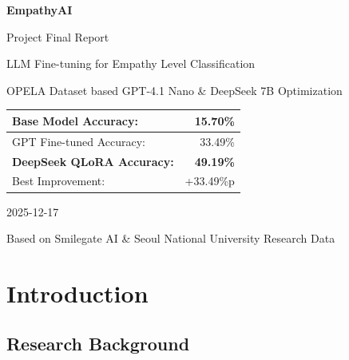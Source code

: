 \documentclass[11pt, a4paper]{article}
\begin{document}
\begin{titlepage}
    \centering
    \vspace*{2cm}
    {\Huge\bfseries\color{primary} EmpathyAI\par}
    \vspace{1cm}
    {\LARGE Project Final Report\par}
    \vspace{1.5cm}
    {\large LLM Fine-tuning for Empathy Level Classification\par}
    \vspace{0.5cm}
    {\large OPELA Dataset based GPT-4.1 Nano \& DeepSeek 7B Optimization\par}
    \vspace{2cm}
    
    \begin{tabular}{|l|r|}
    \hline
    Base Model Accuracy: & 15.70\% \\
    \hline
    GPT Fine-tuned Accuracy: & 33.49\% \\
    \hline
    \textbf{DeepSeek QLoRA Accuracy:} & \textbf{\textcolor{accent}{49.19\%}} \\
    \hline
    Best Improvement: & \textcolor{accent}{+33.49\%p} \\
    \hline
    \end{tabular}
    
    \vspace{2cm}
    {\large 2025-12-17\par}
    \vspace{1cm}
    {\large Based on Smilegate AI \& Seoul National University Research Data\par}
\end{titlepage}

\tableofcontents
\newpage

\section{Introduction}

\subsection{Research Background}
\end{document}
